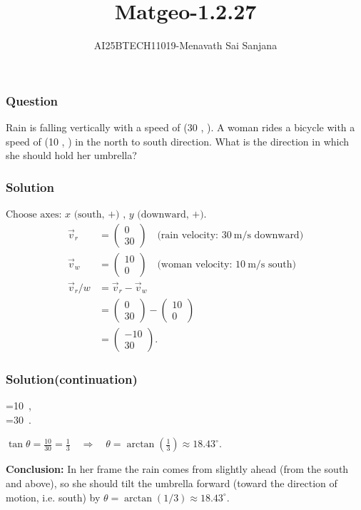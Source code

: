 \documentclass{beamer}
\title{Matgeo-1.2.27}
\author{AI25BTECH11019-Menavath Sai Sanjana}
\date{}
\theoremstyle{remark}
\newcommand{\myvec}[1]{\ensuremath{\begin{pmatrix}#1\end{pmatrix}}}
\begin{document}
\begin{frame}
\titlepage
\end{frame}

\begin{frame}
\frametitle{Question}
Rain is falling vertically with a speed of (30 , ). A woman rides a bicycle with a speed of (10 , ) in the north to south direction. What is the direction in which she should hold her umbrella?
\end{frame}
%
\begin{frame}
\frametitle{Solution}
$
\text{Choose axes: } x\text{ (south, +) , } y\text{ (downward, +).}
$
\begin{align}
\overrightarrow{v}_r&= \myvec{0\\30}\quad\text{(rain velocity: }30\ \text{m/s}\text{ downward)}\\
\overrightarrow{v}_w &= \myvec{10\\0}\quad\text{(woman velocity: }10\ \text{m/s}\text{ south)}\\
\overrightarrow{v}_r/w &= \overrightarrow{v}_r - \overrightarrow{v}_w \\
&= \myvec{0\\30}-\myvec{10\\0} \\
&= \myvec{-10\\30}.
\end{align}
\end{frame}

\begin{frame}
\frametitle{Solution(continuation)}

=10\ ,\qquad \\
=30\ .\qquad


\vspace{1cm}

$
\tan\theta=\frac{10}{30}=\frac{1}{3}\quad\Rightarrow\quad
\theta=\arctan\!\left(\tfrac{1}{3}\right)\approx18.43^\circ.
$
\vspace{1cm}

\noindent\textbf{Conclusion:} In her frame the rain comes from slightly ahead (from the south and above), so she should tilt the umbrella forward (toward the direction of motion, i.e. south) by $\theta=\arctan(1/3)\approx18.43^\circ$.

\end{frame}
\end{document}
